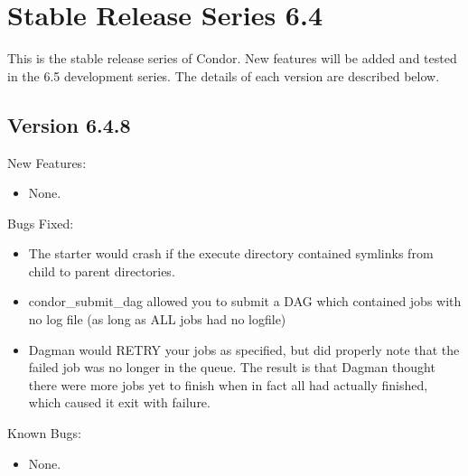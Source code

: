 \section{\label{sec:History-6-4}Stable Release Series 6.4}

This is the stable release series of Condor.
New features will be added and tested in the 6.5 development series. 
The details of each version are described below.

\subsection{\label{sec:New-6-2-0}Version 6.4.8}

\noindent New Features:

\begin{itemize}

\item None.

\end{itemize}

\noindent Bugs Fixed:

\begin{itemize}

\item The starter would crash if the execute directory contained
symlinks from child to parent directories.

\item condor\_submit\_dag allowed you to submit a DAG which contained
jobs with no log file (as long as ALL jobs had no logfile)

\item Dagman would RETRY your jobs as specified, but did properly
note that the failed job was no longer in the queue.  The result is
that Dagman thought there were more jobs yet to finish when in fact
all had actually finished, which caused it exit with failure.

\end{itemize}

\noindent Known Bugs:

\begin{itemize}

\item None.

\end{itemize}

